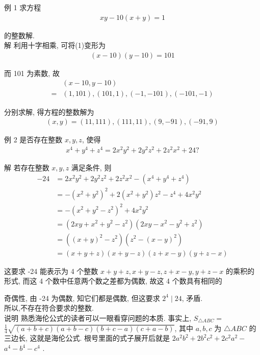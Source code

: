 例 1 求方程
\begin{align*}
	x y-10(x+y)=1
\end{align*}

的整数解.\\
解 利用十字相乘, 可将(1)变形为
\begin{align*}
	(x-10)(y-10)=101
\end{align*}

而 101 为素数, 故\begin{align}
	  & (x-10, y-10)                        \\
	= & (1,101),(101,1),(-1,-101),(-101,-1)
\end{align}

分别求解, 得方程的整数解为
\begin{align*}
	(x, y)=(11,111),(111,11),(9,-91),(-91,9)
\end{align*}

例 2 是否存在整数 $x ,  y ,  z$, 使得
\begin{align*}
	x^{4}+y^{4}+z^{4}=2 x^{2} y^{2}+2 y^{2} z^{2}+2 z^{2} x^{2}+24 ?
\end{align*}

解 若存在整数 $x ,  y ,  z$ 满足条件, 则\begin{align}
	-24 & =2 x^{2} y^{2}+2 y^{2} z^{2}+2 z^{2} x^{2}-\left(x^{4}+y^{4}+z^{4}\right)          \\
	    & =-\left(x^{2}+y^{2}\right)^{2}+2\left(x^{2}+y^{2}\right) z^{2}-z^{4}+4 x^{2} y^{2} \\
	    & =-\left(x^{2}+y^{2}-z^{2}\right)^{2}+4 x^{2} y^{2}                                 \\
	    & =\left(2 x y+x^{2}+y^{2}-z^{2}\right)\left(2 x y-x^{2}-y^{2}+z^{2}\right)          \\
	    & =\left((x+y)^{2}-z^{2}\right)\left(z^{2}-(x-y)^{2}\right)                          \\
	    & =(x+y+z)(x+y-z)(z+x-y)(y+z-x)
\end{align}

这要求 -24 能表示为 4 个整数 $x+y+z, x+y-z, z+x-y, y+z-x$ 的乘积的形式, 而这 4 个数中任意两个数之差都为偶数, 故这 4 个数具有相同的

奇偶性, 由 -24 为偶数, 知它们都是偶数, 但这要求 $2^{4} \mid 24$, 矛盾.\\
所以,不存在符合要求的整数.\\
说明 熟悉海伦公式的读者可以一眼看穿问题的本质. 事实上, $S_{\triangle A B C}=$ $\frac{1}{4} \sqrt{(a+b+c)(a+b-c)(b+c-a)(c+a-b)}$, 其中 $a ,  b ,  c$ 为 $\triangle A B C$ 的三边长, 这就是海伦公式. 根号里面的式子展开后就是 $2 a^{2} b^{2}+2 b^{2} c^{2}+2 c^{2} a^{2}-$ $a^{4}-b^{4}-c^{4}$ .

